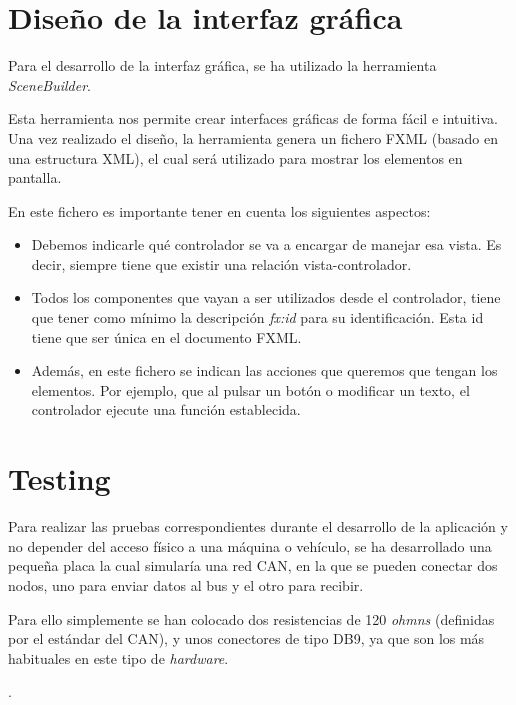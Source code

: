 \section{Diseño de la interfaz gráfica}\label{diseño_de_la_interfaz_grafica}

Para el desarrollo de la interfaz gráfica, se ha utilizado la herramienta \emph{SceneBuilder}.

Esta herramienta nos permite crear interfaces gráficas de forma fácil e intuitiva. Una vez realizado el diseño, la herramienta genera un fichero FXML (basado en una estructura XML), el cual será utilizado para mostrar los elementos en pantalla.

En este fichero es importante tener en cuenta los siguientes aspectos:

\begin{itemize}

\item
Debemos indicarle qué controlador se va a encargar de manejar esa vista. Es decir, siempre tiene que existir una relación vista-controlador.
\item
Todos los componentes que vayan a ser utilizados desde el controlador, tiene que tener como mínimo la descripción \emph{fx:id} para su identificación. Esta id tiene que ser única en el documento FXML.
\item
Además, en este fichero se indican las acciones que queremos que tengan los elementos. Por ejemplo, que al pulsar un botón o modificar un texto, el controlador ejecute una función establecida.

\end{itemize}



\section{Testing}\label{testing}

Para realizar las pruebas correspondientes durante el desarrollo de la aplicación y no depender del acceso físico a una máquina o vehículo, se ha desarrollado una pequeña placa la cual simularía una red CAN, en la que se pueden conectar dos nodos, uno para enviar datos al bus y el otro para recibir.

Para ello simplemente se han colocado dos resistencias de 120 \emph{ohmns} (definidas por el estándar del CAN), y unos conectores de tipo DB9, ya que son los más habituales en este tipo de \emph{hardware}.

.


